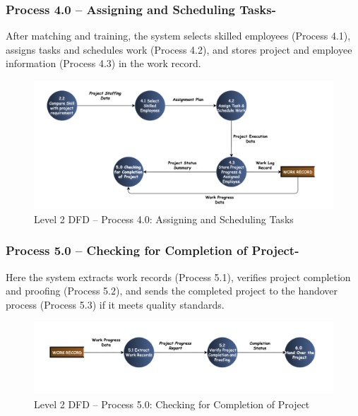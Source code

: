 \documentclass[12pt,a4paper]{article}
\begin{document}
\newpage
\subsubsection*{Process 4.0 – Assigning and Scheduling Tasks-}
\noindent
After matching and training, the system selects skilled employees (Process 4.1), assigns tasks and schedules work (Process 4.2), and stores project and employee information (Process 4.3) in the work record.

\begin{figure}[H]
    \centering
    \includegraphics[width=\textwidth]{Fig/process4_dfd.png}
    \caption{Level 2 DFD – Process 4.0: Assigning and Scheduling Tasks}
    \label{fig:level2_process4}
\end{figure}

\vspace{1.8cm}
\subsubsection*{Process 5.0 – Checking for Completion of Project-}
\noindent
Here the system extracts work records (Process 5.1), verifies project completion and proofing (Process 5.2), and sends the completed project to the handover process (Process 5.3) if it meets quality standards.

\begin{figure}[H]
    \centering
    \includegraphics[width=\textwidth]{Fig/process5_dfd.png}
    \caption{Level 2 DFD – Process 5.0: Checking for Completion of Project}
    \label{fig:level2_process5}
\end{figure}
\end{document}

